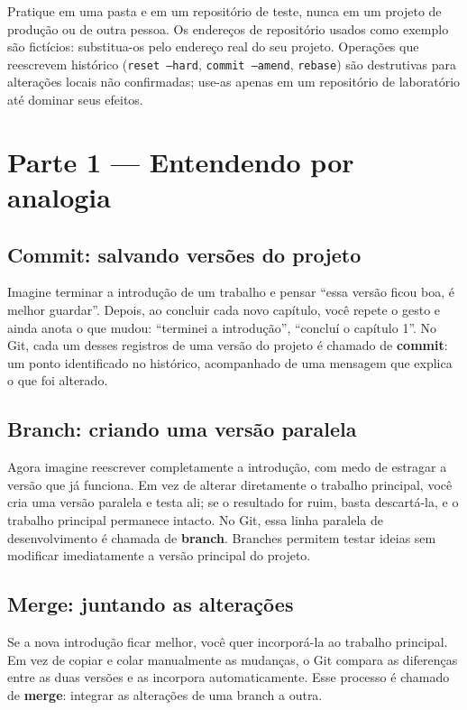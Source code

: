 \documentclass[11pt,a4paper]{article}
\begin{document}
\begin{tcolorbox}[alertbox,title={ANTES DE EXECUTAR OS COMANDOS}]
Pratique em uma pasta e em um repositório de teste, nunca em um projeto de produção ou de outra pessoa. Os endereços de repositório usados como exemplo são fictícios: substitua-os pelo endereço real do seu projeto. Operações que reescrevem histórico (\texttt{reset --hard}, \texttt{commit --amend}, \texttt{rebase}) são destrutivas para alterações locais não confirmadas; use-as apenas em um repositório de laboratório até dominar seus efeitos.
\end{tcolorbox}

\section*{Parte 1 --- Entendendo por analogia}
\subsection*{Commit: salvando versões do projeto}
Imagine terminar a introdução de um trabalho e pensar ``essa versão ficou boa, é melhor guardar''. Depois, ao concluir cada novo capítulo, você repete o gesto e ainda anota o que mudou: ``terminei a introdução'', ``concluí o capítulo 1''. No Git, cada um desses registros de uma versão do projeto é chamado de \textbf{commit}: um ponto identificado no histórico, acompanhado de uma mensagem que explica o que foi alterado.

\subsection*{Branch: criando uma versão paralela}
Agora imagine reescrever completamente a introdução, com medo de estragar a versão que já funciona. Em vez de alterar diretamente o trabalho principal, você cria uma versão paralela e testa ali; se o resultado for ruim, basta descartá-la, e o trabalho principal permanece intacto. No Git, essa linha paralela de desenvolvimento é chamada de \textbf{branch}. Branches permitem testar ideias sem modificar imediatamente a versão principal do projeto.

\subsection*{Merge: juntando as alterações}
Se a nova introdução ficar melhor, você quer incorporá-la ao trabalho principal. Em vez de copiar e colar manualmente as mudanças, o Git compara as diferenças entre as duas versões e as incorpora automaticamente. Esse processo é chamado de \textbf{merge}: integrar as alterações de uma branch a outra.
\end{document}
